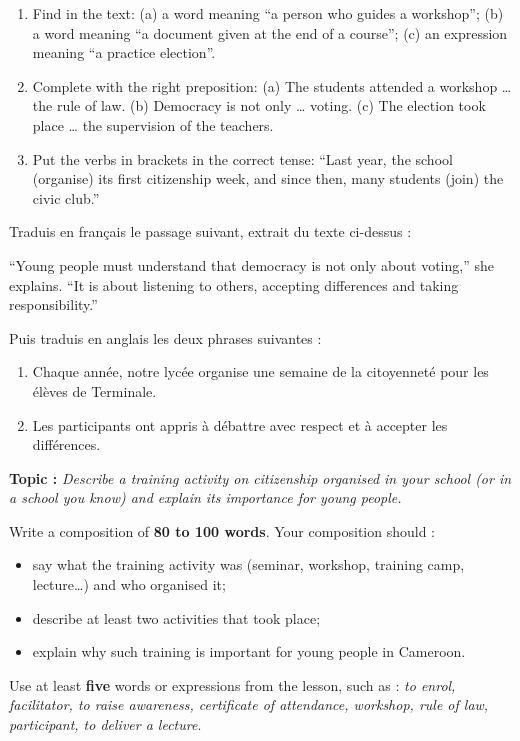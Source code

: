 \documentclass[11pt]{article}
\newcommand{\cle}[1]{{\popxbold\color{popdark}#1}}
\begin{document}
\begin{exercice}
\begin{enumerate}
\item Find in the text: (a) a word meaning “a person who guides a workshop”; (b) a word meaning “a document given at the end of a course”; (c) an expression meaning “a practice election”.
\item Complete with the right preposition: (a) The students attended a workshop \cle{\dots} the rule of law. (b) Democracy is not only \cle{\dots} voting. (c) The election took place \cle{\dots} the supervision of the teachers.
\item Put the verbs in brackets in the correct tense: “Last year, the school (organise) its first citizenship week, and since then, many students (join) the civic club.”
\end{enumerate}
\end{exercice}

\begin{exercice}
Traduis en français le passage suivant, extrait du texte ci-dessus :

\begin{textebox}
“Young people must understand that democracy is not only about voting,” she explains. “It is about listening to others, accepting differences and taking responsibility.”
\end{textebox}

Puis traduis en anglais les deux phrases suivantes :

\begin{enumerate}
\item Chaque année, notre lycée organise une semaine de la citoyenneté pour les élèves de Terminale.
\item Les participants ont appris à débattre avec respect et à accepter les différences.
\end{enumerate}
\end{exercice}

\begin{exercice}
\textbf{Topic :} \emph{Describe a training activity on citizenship organised in your school (or in a school you know) and explain its importance for young people.}

Write a composition of \textbf{80 to 100 words}. Your composition should :

\begin{itemize}
\item say what the training activity was (seminar, workshop, training camp, lecture\ldots) and who organised it;
\item describe at least two activities that took place;
\item explain why such training is important for young people in Cameroon.
\end{itemize}

Use at least \textbf{five} words or expressions from the lesson, such as : \emph{to enrol, facilitator, to raise awareness, certificate of attendance, workshop, rule of law, participant, to deliver a lecture}.
\end{exercice}
\end{document}
